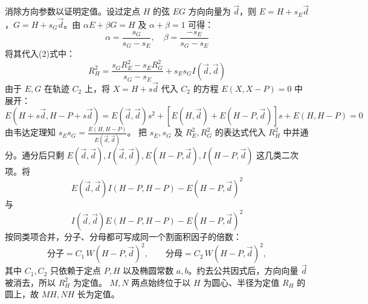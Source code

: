 \begin{solution}
消除方向参数以证明定值。设过定点 $H$ 的弦 $EG$ 方向向量为 $\vec{d}$，则 $E = H + s_E\vec{d}$，$G = H + s_G\vec{d}$。由 $\alpha E + \beta G = H$ 及 $\alpha+\beta=1$ 可得：
$$\alpha = \frac{s_G}{s_G-s_E}, \quad \beta = \frac{-s_E}{s_G-s_E}$$
将其代入(2)式中：
$$R_H^2 = \frac{s_G R_E^2 - s_E R_G^2}{s_G - s_E} + s_E s_G I(\vec{d},\vec{d})$$
由于 $E, G$ 在轨迹 $C_2$ 上，将 $X = H + s\vec{d}$ 代入 $C_2$ 的方程 $E(X, X-P) = 0$ 中展开：
$$E(H+s\vec{d}, H-P+s\vec{d}) = E(\vec{d},\vec{d})s^2 + [E(H,\vec{d}) + E(H-P,\vec{d})]s + E(H, H-P) = 0$$
由韦达定理知 $s_E s_G = \frac{E(H, H-P)}{E(\vec{d},\vec{d})}$。
把 $s_E, s_G$ 及 $R_E^2, R_G^2$ 的表达式代入 $R_H^2$ 中并通分。通分后只剩 $E(\vec d,\vec d),I(\vec d,\vec d),E(H-P,\vec d),I(H-P,\vec d)$ 这几类二次项。将
\[
E(\vec d,\vec d)I(H-P,H-P)-E(H-P,\vec d)^2
\]
与
\[
I(\vec d,\vec d)E(H-P,H-P)-E(H-P,\vec d)^2
\]
按同类项合并，分子、分母都可写成同一个割面积因子的倍数：
\[
\text{分子}=C_1\,W(H-P,\vec d)^2,\qquad
\text{分母}=C_2\,W(H-P,\vec d)^2,
\]
其中 $C_1,C_2$ 只依赖于定点 $P,H$ 以及椭圆常数 $a,b$。约去公共因式后，方向向量 $\vec d$ 被消去，所以 $R_H^2$ 为定值。
$M, N$ 两点始终位于以 $H$ 为圆心、半径为定值 $R_H$ 的圆上，故 $MH, NH$ 长为定值。
\end{solution}

